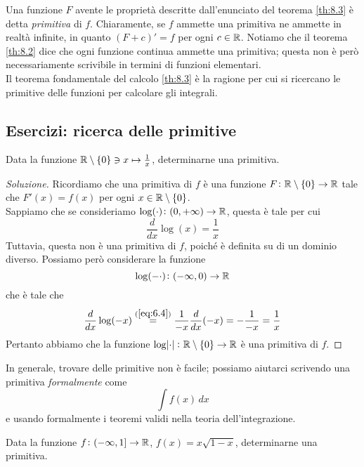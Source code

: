 \begin{remark}
    Una funzione $F$ avente le proprietà descritte dall'enunciato del teorema \ref{th:8.3} è detta \emph{primitiva} di $f$. Chiaramente, se $f$ ammette una primitiva ne ammette in realtà infinite, in quanto $(F+c)' = f$ per ogni $c\in\amsbb{R}$. Notiamo che il teorema \ref{th:8.2} dice che ogni funzione continua ammette una primitiva; questa non è però necessariamente scrivibile in termini di funzioni elementari.\\ 
    Il teorema fondamentale del calcolo \ref{th:8.3} è la ragione per cui si ricercano le primitive delle funzioni per calcolare gli integrali.
\end{remark}
\subsection{Esercizi: ricerca delle primitive}
\begin{exercise}
    \label{ex:8.1}
    Data la funzione $\amsbb{R}\setminus\{0\}\ni x \mapsto \frac{1}{x}$, determinarne una primitiva.
\end{exercise}
\begin{proof}[Soluzione]
    Ricordiamo che una primitiva di $f$ è una funzione $F\colon \amsbb{R}\setminus\{0\}\to \amsbb{R}$ tale che $F'(x) = f(x)$ per ogni $x\in\amsbb{R}\setminus\{0\}$.\\
    Sappiamo che se consideriamo $\log(\cdot)\colon (0, +\infty)\to \amsbb{R}$, questa è tale per cui
    \[
    \frac{d}{dx}\log(x) = \frac{1}{x}
    \]
    Tuttavia, questa non è una primitiva di $f$, poiché è definita su di un dominio diverso. Possiamo però considerare la funzione
    \[
    \log(-\cdot)\colon (-\infty, 0) \to \amsbb{R}
    \]
    che è tale che
    \[
    \frac{d}{dx}\log(-x) \overset{(\ref{eq:6.4})}{=} \frac{1}{-x}\frac{d}{dx}(-x) = -\frac{1}{-x} = \frac{1}{x}
    \]
    Pertanto abbiamo che la funzione $\log\abs{\cdot}\colon \amsbb{R}\setminus\{0\}\to \amsbb{R}$ è una primitiva di $f$.
\end{proof}
\begin{remark}
    In generale, trovare delle primitive non è facile; possiamo aiutarci scrivendo una primitiva \emph{formalmente} come
    \[
    \int f(x)\, dx
    \]
    e usando formalmente i teoremi validi nella teoria dell'integrazione.
\end{remark}
\begin{exercise}
    \label{ex:8.2}
    Data la funzione $f\colon(-\infty, 1] \to \amsbb{R}$, $f(x) = x\sqrt{1-x}$, determinarne una primitiva.
\end{exercise}
